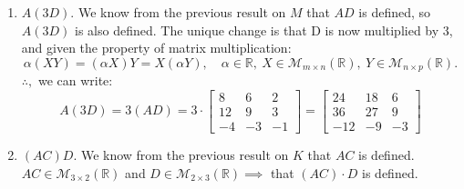 \begin{enumerate}[label=\Alph*)]
\begin{answer}
$$\begin{aligned}
                        i \in \{1,2,3\},\ j \in \{1,2,3\}.\\[0.5em]
                        FE & = \begin{bmatrix}
                            -9 & 8 & 9 \\
                            2 & -2 & -9 \\
                            -7 & 8 & 13
                        \end{bmatrix}
                        \end{aligned}$$
                \end{answer}
            \item \begin{answer} %
                $A(3D)$. We know from the previous result on $M$ that $AD$ is defined, so $A(3D)$ is also defined.
                The unique change is that  D is now multiplied by 3, and given the property of matrix multiplication:
                $$
                    \alpha(XY) = (\alpha X)Y = X(\alpha Y), \quad \alpha \in \mathbb{R},\ X \in \mathcal{M}_{m\times n}(\mathbb{R}),\ Y \in \mathcal{M}_{n\times p}(\mathbb{R}).
                $$\quad $\therefore,$ we can write:
                $$
                    A(3D) = 3(AD) = 3 \cdot \begin{bmatrix}
                        8 & 6 & 2 \\
                        12 & 9 & 3 \\
                        -4 & -3 & -1
                    \end{bmatrix} = \begin{bmatrix}
                        24 & 18 & 6 \\
                        36 & 27 & 9 \\
                        -12 & -9 & -3
                    \end{bmatrix}
                $$
            \end{answer}
            \item \begin{answer} %
                $(AC)D$. We know from the previous result on $K$ that $AC$ is defined. \\ 
                $AC \in \mathcal{M}_{3 \times 2}(\mathbb{R})$ and $D \in \mathcal{M}_{2 \times 3}(\mathbb{R}) \implies$ that $(AC) \cdot D$ is defined.


\end{answer}
\end{enumerate}
